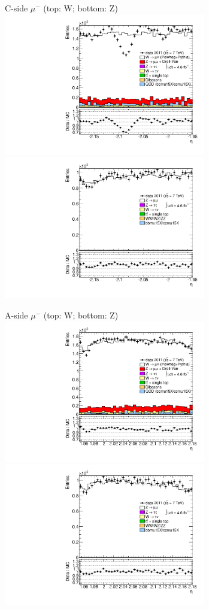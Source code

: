 {{
C-side $\mu^{-}$ (top: W; bottom: Z)
\centering
\includegraphics[width=0.66\textwidth]{dates/20130306/figures/etaphi/WpMtoM_10_C_stack_l_eta_NEG} \\
\includegraphics[width=0.66\textwidth]{dates/20130306/figures/etaphi/Z_10_C_stack_lN_eta_ALL.pdf}

A-side $\mu^{-}$ (top: W; bottom: Z)
\centering
\includegraphics[width=0.66\textwidth]{dates/20130306/figures/etaphi/WpMtoM_10_A_stack_l_eta_NEG} \\
\includegraphics[width=0.66\textwidth]{dates/20130306/figures/etaphi/Z_10_A_stack_lN_eta_ALL.pdf} 

}}
